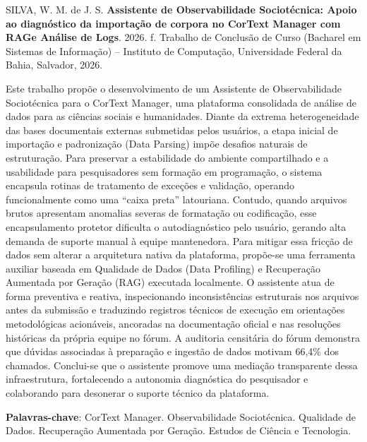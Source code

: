 \documentclass[
	oneside,
	a4paper,
	12pt,
	chapter=TITLE,
	section=TITLE,
	english,
	brazilian
]{abntex2}
\def\MakeUppercase#1{#1}%
\begin{document}
\begin{resumo}
  \SingleSpacing
  \noindent SILVA, W. M. de J. S. \textbf{Assistente de Observabilidade Sociotécnica: Apoio ao diagnóstico da importação de corpora no CorText Manager com RAG\space e Análise de Logs}. 2026. \pageref{LastPage} f. Trabalho de Conclusão de Curso (Bacharel em Sistemas de Informação) -- Instituto de Computação, Universidade Federal da Bahia, Salvador, 2026.

  \vspace{1.0cm}
  \begin{center}
    {\ABNTEXchapterfontsize\bfseries\MakeUppercase{\resumoname}}
  \end{center}
  \vspace{0.6cm}

  \noindent Este trabalho propõe o desenvolvimento de um Assistente de Observabilidade Sociotécnica para o CorText Manager, uma plataforma consolidada de análise de dados para as ciências sociais e humanidades. Diante da extrema heterogeneidade das bases documentais externas submetidas pelos usuários, a etapa inicial de importação e padronização (Data Parsing) impõe desafios naturais de estruturação. Para preservar a estabilidade do ambiente compartilhado e a usabilidade para pesquisadores sem formação em programação, o sistema encapsula rotinas de tratamento de exceções e validação, operando funcionalmente como uma ``caixa preta'' latouriana. Contudo, quando arquivos brutos apresentam anomalias severas de formatação ou codificação, esse encapsulamento protetor dificulta o autodiagnóstico pelo usuário, gerando alta demanda de suporte manual à equipe mantenedora. Para mitigar essa fricção de dados sem alterar a arquitetura nativa da plataforma, propõe-se uma ferramenta auxiliar baseada em Qualidade de Dados (Data Profiling) e Recuperação Aumentada por Geração (RAG) executada localmente. O assistente atua de forma preventiva e reativa, inspecionando inconsistências estruturais nos arquivos antes da submissão e traduzindo registros técnicos de execução em orientações metodológicas acionáveis, ancoradas na documentação oficial e nas resoluções históricas da própria equipe no fórum. A auditoria censitária do fórum demonstra que dúvidas associadas à preparação e ingestão de dados motivam 66,4\% dos chamados. Conclui-se que o assistente promove uma mediação transparente dessa infraestrutura, fortalecendo a autonomia diagnóstica do pesquisador e colaborando para desonerar o suporte técnico da plataforma.

  \vspace{0.5cm}
  \noindent\textbf{Palavras-chave}: CorText Manager. Observabilidade Sociotécnica. Qualidade de Dados. Recuperação Aumentada por Geração. Estudos de Ciência e Tecnologia.
\end{resumo}
\end{document}
